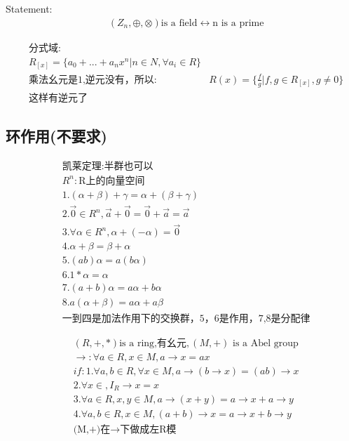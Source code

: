 \documentclass[12pt, a4paper]{article}  %
\begin{document}
Statement:
\begin{align}
    &(Z_n,\oplus,\otimes)\text{is a field}\leftrightarrow \text{n is a prime}
\end{align}

\begin{align}
    &\text{分式域:}\\
    &R_{[x]}=\{a_0+...+a_n x^n|n\in N,\forall a_i\in R\}\\
    &\text{乘法幺元是1,逆元没有，所以:}
    &R(x)=\{\frac{f}{g}|f,g\in R_{[x]},g\neq 0\}\\
    &\text{这样有逆元了}
\end{align}

\subsection{环作用(不要求)}

\begin{align}
    &\text{凯莱定理:半群也可以}\\
    &R^n:\text{R上的向量空间}\\
    &1. (\alpha+\beta)+\gamma=\alpha+(\beta+\gamma)\\
    &2. \overset{\rightarrow}{0}\in R^n,\overset{\rightarrow}{a}+\overset{\rightarrow}{0}=\overset{\rightarrow}{0}+\overset{\rightarrow}{a}=\overset{\rightarrow}{a}\\
    &3.\forall \alpha \in R^n,\alpha+(-\alpha)=\overset{\rightarrow}{0}\\
    &4.\alpha +\beta=\beta+\alpha\\
    &5.(ab)\alpha=a(b\alpha)\\
    &6.1*\alpha=\alpha\\
    &7.(a+b)\alpha=a\alpha+b\alpha\\
    &8. a(\alpha+\beta)=a\alpha +a\beta \\
    &\text{一到四是加法作用下的交换群，5，6是作用，7,8是分配律}
\end{align}

\begin{align}
    &(R,+,*)\text{is a ring,有幺元},(M,+)\text{ is a Abel group}\\
    &\rightarrow :\forall a\in R,x\in M,a\rightarrow x=ax\\
    &if:1.\forall a,b\in R,\forall x\in M,a\rightarrow (b\rightarrow x)=(ab)\rightarrow x\\
    &2.\forall x\in ,I_R\rightarrow x=x\\
    &3.\forall a\in R,x,y\in M,a\rightarrow(x+y)=a\rightarrow x+a\rightarrow y\\
    &4.\forall a,b\in R,x\in M,(a+b)\rightarrow x=a\rightarrow x+b\rightarrow y\\
    &\text{(M,+)在}\rightarrow \text{下做成左R模}
\end{align}
\end{document}
